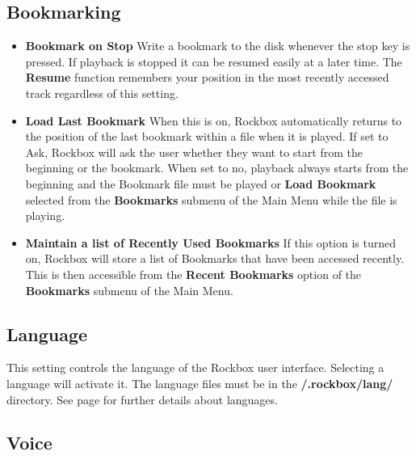 \begin{itemize}
\begin{itemize}
\end{itemize}

\subsection{\label{ref:Bookmarkconfigactual}Bookmarking}

\begin{itemize}
\item \textbf{Bookmark on Stop}
  Write a bookmark to the disk whenever the stop key is pressed.  If playback is stopped it can be resumed easily at a later time. The \textbf{Resume} function remembers your position in the most recently accessed track regardless of this setting.
\item \textbf{Load Last Bookmark}
  When this is on, Rockbox automatically returns to the position of the last bookmark within a file when it is played.  If set to Ask, Rockbox will ask the user whether they want to start from the beginning or the bookmark.  When set to no, playback always starts from the beginning and the Bookmark file must be played or \textbf{Load Bookmark} selected from the \textbf{Bookmarks} submenu of the Main Menu while the file is playing.
\item \textbf{Maintain a list of Recently Used Bookmarks}
  If this option is turned on, Rockbox will store a list of Bookmarks that have been accessed recently.  This is then accessible from the \textbf{Recent Bookmarks} option of the \textbf{Bookmarks} submenu of the Main Menu.
\end{itemize}

\subsection{\label{ref:Language}Language}
This setting controls the language of the Rockbox user interface. Selecting  a language will activate it. The language files must be in the \textbf{/.rockbox/lang/} directory. See page \pageref{ref:Loadinglanguages} for further details about languages.

\subsection{Voice}


\end{itemize}
